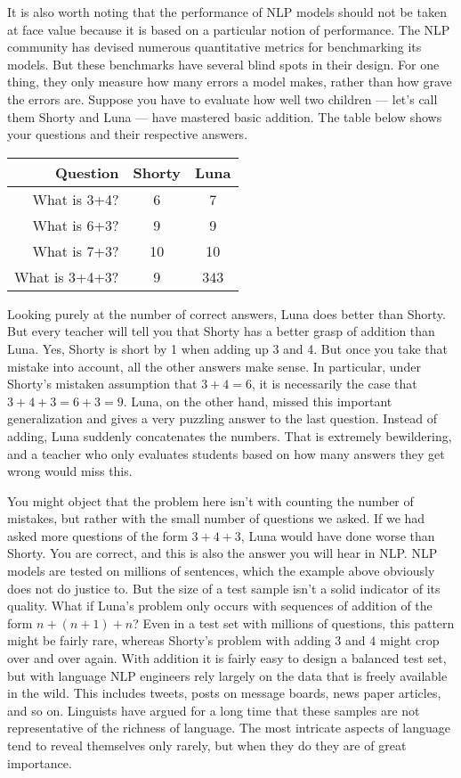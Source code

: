 It is also worth noting that the performance of NLP models should not be taken at face value because it is based on a particular notion of performance.
The NLP community has devised numerous quantitative metrics for benchmarking its models.
But these benchmarks have several blind spots in their design.
For one thing, they only measure how many errors a model makes, rather than how grave the errors are.
Suppose you have to evaluate how well two children --- let's call them Shorty and Luna --- have mastered basic addition.
The table below shows your questions and their respective answers.
%
\begin{center}
    \begin{tabular}{rcc}
        \toprule
        \textbf{Question} & \textbf{Shorty} & \textbf{Luna}\\
        \midrule
        What is 3+4? & 6 & 7\\
        What is 6+3? & 9 & 9\\
        What is 7+3? & 10 & 10\\
        What is 3+4+3? & 9 & 343\\
        \bottomrule
    \end{tabular}
\end{center}
%
Looking purely at the number of correct answers, Luna does better than Shorty.
But every teacher will tell you that Shorty has a better grasp of addition than Luna.
Yes, Shorty is short by 1 when adding up 3 and 4.
But once you take that mistake into account, all the other answers make sense.
In particular, under Shorty's mistaken assumption that $3 + 4 = 6$, it is necessarily the case that $3 + 4 + 3 = 6 + 3 = 9$.
Luna, on the other hand, missed this important generalization and gives a very puzzling answer to the last question.
Instead of adding, Luna suddenly concatenates the numbers.
That is extremely bewildering, and a teacher who only evaluates students based on how many answers they get wrong would miss this.

You might object that the problem here isn't with counting the number of mistakes, but rather with the small number of questions we asked.
If we had asked more questions of the form $3 + 4 + 3$, Luna would have done worse than Shorty.
You are correct, and this is also the answer you will hear in NLP.
NLP models are tested on millions of sentences, which the example above obviously does not do justice to.
But the size of a test sample isn't a solid indicator of its quality.
What if Luna's problem only occurs with sequences of addition of the form $n + (n + 1) + n$?
Even in a test set with millions of questions, this pattern might be fairly rare, whereas Shorty's problem with adding $3$ and $4$ might crop over and over again.
With addition it is fairly easy to design a balanced test set, but with language NLP engineers rely largely on the data that is freely available in the wild.
This includes tweets, posts on message boards, news paper articles, and so on.
Linguists have argued for a long time that these samples are not representative of the richness of language.
The most intricate aspects of language tend to reveal themselves only rarely, but when they do they are of great importance.

